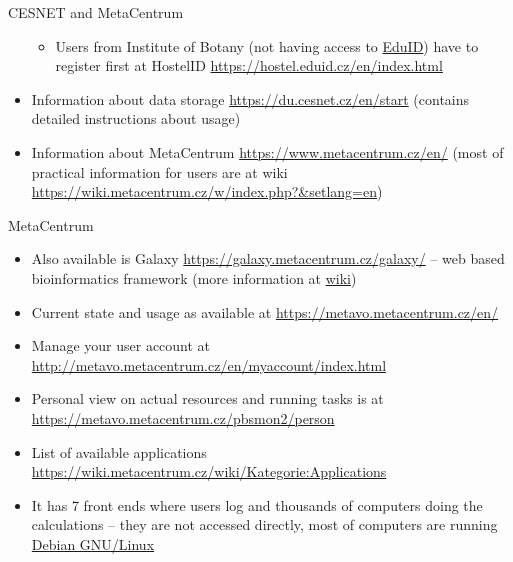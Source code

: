 \documentclass[compress, ucs, xelatex, 11pt, xcolor=svgnames,
  hyperref={
    bookmarks=true,
    unicode=true,
    colorlinks=true,
    pdftitle={Linux, command line and MetaCentrum},
    plainpages=false,
    pdfauthor={Vojtech Zeisek},
    pdfsubject={Course about use of Linux command line, writing shell scripts and using MetaCentrum of CESNET},
    pdfcreator={XeLaTeX},
    pdfkeywords={Linux, GNU, BASH, shell, command line, MetaCentrum},
    linkcolor=Red,
    anchorcolor=Blue,
    citecolor=Purple,
    filecolor=DodgerBlue,
    menucolor=DarkOrchid,
    urlcolor=DeepSkyBlue,
    pdftex},
  url={hyphens, lowtilde} %
  ]{beamer}
\begin{document}
\begin{frame}[allowframebreaks]{CESNET and MetaCentrum}
\begin{itemize}
\begin{itemize}
    \item Users from Institute of Botany (not having access to \href{https://www.eduid.cz/en/index}{EduID}) have to register first at HostelID \url{https://hostel.eduid.cz/en/index.html}
  \end{itemize}
  \item Information about data storage \url{https://du.cesnet.cz/en/start} (contains detailed instructions about usage)
  \item Information about MetaCentrum \url{https://www.metacentrum.cz/en/} (most of practical information for users are at wiki \url{https://wiki.metacentrum.cz/w/index.php?&setlang=en})
\end{itemize}
\end{frame}

\begin{frame}{MetaCentrum}
\begin{itemize}
  \item Also available is Galaxy \url{https://galaxy.metacentrum.cz/galaxy/} -- web based bioinformatics framework (more information at \href{https://wiki.metacentrum.cz/wiki/Galaxy_application}{wiki})
  \item Current state and usage as available at \url{https://metavo.metacentrum.cz/en/}
  \item Manage your user account at \url{http://metavo.metacentrum.cz/en/myaccount/index.html}
  \item Personal view on actual resources and running tasks is at \url{https://metavo.metacentrum.cz/pbsmon2/person}
  \item List of available applications \url{https://wiki.metacentrum.cz/wiki/Kategorie:Applications}
  \item It has 7 front ends where users log and thousands of computers doing the calculations -- they are not accessed directly, most of computers are running \href{https://www.debian.org/}{Debian GNU/Linux}
\end{itemize}
\end{frame}
\end{document}
